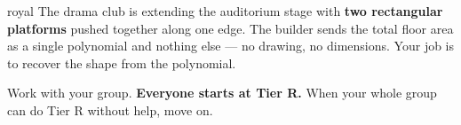 \documentclass[10pt]{article}
\begin{document}

\vspace{0.15in}

\begin{scenariobox}{royal}
\small
The drama club is extending the auditorium stage with \textbf{two rectangular platforms} pushed
together along one edge. The builder sends the total floor area as a single polynomial and nothing
else --- no drawing, no dimensions. Your job is to recover the shape from the polynomial.

Work with your group. \textbf{Everyone starts at Tier R.} When your whole group can do Tier R
without help, move on.
\end{scenariobox}

\vspace{0.10in}
\end{document}
